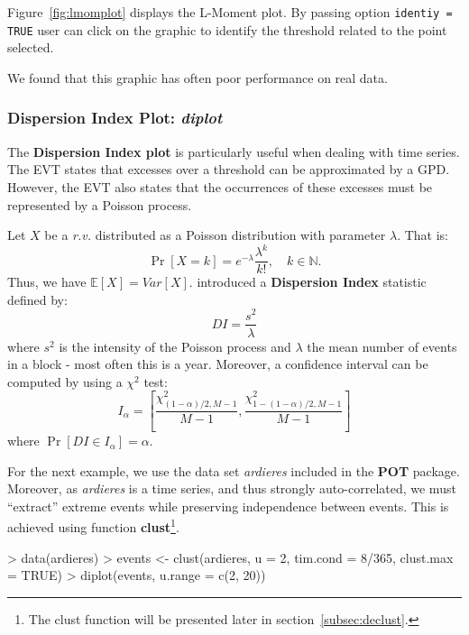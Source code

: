 \documentclass[a4paper]{article}
\numberwithin{equation}{section}
\theoremstyle{definition}
\begin{document}
Figure~\ref{fig:lmomplot} displays the L-Moment plot. By passing
option \verb+identiy = TRUE+ user can click on the graphic to identify
the threshold related to the point selected.

We found that this graphic has often poor performance on real data.

\subsubsection{Dispersion Index Plot: \emph{diplot}}

The \textbf{Dispersion Index plot} is particularly useful when dealing
with time series. The EVT states that excesses over a threshold can be
approximated by a GPD\@. However, the EVT also states that the
occurrences of these excesses must be represented by a Poisson
process.

Let $X$ be a \textit{r.v.} distributed as a Poisson distribution with
parameter $\lambda$. That is:
\begin{equation}
  \label{eq:poissLaw}
  \Pr\left[X = k\right] = e^{-\lambda} \frac{\lambda^k}{k!}, \quad k
  \in \mathbb{N}.
\end{equation}
Thus, we have $\mathbb{E}\left[X\right] =
Var\left[X\right]$. \citet{Cunnane1979} introduced a
\textbf{Dispersion Index} statistic defined by:
\begin{equation}
  \label{eq:DI}
  DI = \frac{s^2}{\lambda}
\end{equation}
where $s^2$ is the intensity of the Poisson process and $\lambda$ the
mean number of events in a block - most often this is a
year. Moreover, a confidence interval can be computed by using a
$\chi^2$ test:
\begin{equation}
  \label{eq:confDI}
   I_{\alpha} = \left[ \frac{\chi^2_{\left(1 - \alpha\right) / 2,
        M-1}}{M-1}, \frac{\chi^2_{1 - \left( 1 -\alpha\right) / 2,
        M-1}}{M-1} \right]
\end{equation}
where $\Pr\left[ DI \in I_{\alpha} \right] = \alpha$.

For the next example, we use the data set \emph{ardieres} included in
the \textbf{POT} package. Moreover, as \emph{ardieres} is a time
series, and thus strongly auto-correlated, we must ``extract'' extreme
events while preserving independence between events. This is achieved
using function \textbf{clust}\footnote{The clust function will be
  presented later in section~\ref{subsec:declust}.}.

\begin{Schunk}
\begin{Sinput}
> data(ardieres)
> events <- clust(ardieres, u = 2, tim.cond = 8/365, clust.max = TRUE)
> diplot(events, u.range = c(2, 20))
\end{Sinput}
\end{Schunk}
\end{document}
